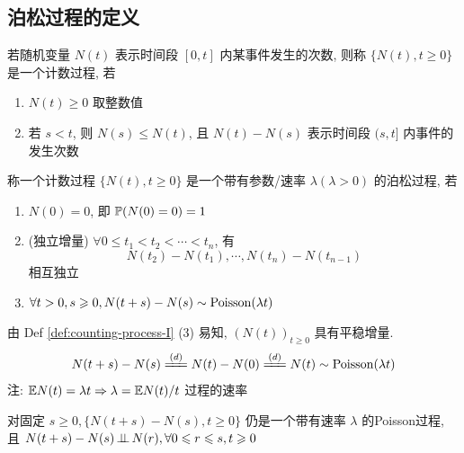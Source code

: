\subsection{泊松过程的定义}

\begin{definition}[计数过程]
    若随机变量 $N(t)$ 表示时间段 $[0,t]$ 内某事件发生的次数, 则称 $\{N(t),t\geq 0\}$ 是一个计数过程, 若
    \begin{enumerate}
        \item $N(t)\geq 0$ 取整数值
        \item 若 $s<t$, 则 $N(s)\leq N(t)$, 且 $N(t)-N(s)$ 表示时间段 $(s,t]$ 内事件的发生次数
    \end{enumerate}
\end{definition}

\begin{definition}[泊松过程I]\label{def:counting-process-I}
    称一个计数过程 $\{N(t),t\geq 0\}$ 是一个带有参数/速率 $\lambda(\lambda>0)$ 的泊松过程, 若
    \begin{enumerate}
        \item $N(0)=0$, 即 $\mathbb{P}(N(0)=0)=1$
        \item (独立增量) $\forall 0\leq t_1<t_2<\cdots<t_n$, 有
        \[
        N(t_2)-N(t_1),\cdots,N(t_n)-N(t_{n-1})
        \]
        相互独立
        \item $\forall t>0,s\geqslant 0, N(t+s)-N(s)\sim \operatorname{Poisson}(\lambda t)$
    \end{enumerate}
\end{definition}

\begin{property}
由 Def \ref{def:counting-process-I} (3) 易知, $(N(t))_{t\geq 0}$ 具有平稳增量.
\[
N(t+s)-N(s)\xlongequal{(d)} N(t)-N(0)\xlongequal{(d)}N(t)\sim \Poi(\lambda t)
\]
注: $\mathbb E N(t)=\lambda t\Rightarrow \lambda=\mathbb E N(t)/t$ 过程的速率
\end{property}

\begin{property}
对固定 $s\geq 0, \{N(t+s)-N(s),t\geq 0\}$ 仍是一个带有速率 $\lambda$ 的Poisson过程, 且 $N(t+s)-N(s)\operatorname{\perp\!\!\!\perp} N(r), \forall 0\leqslant r\leqslant s,t\geqslant 0$
\end{property}

